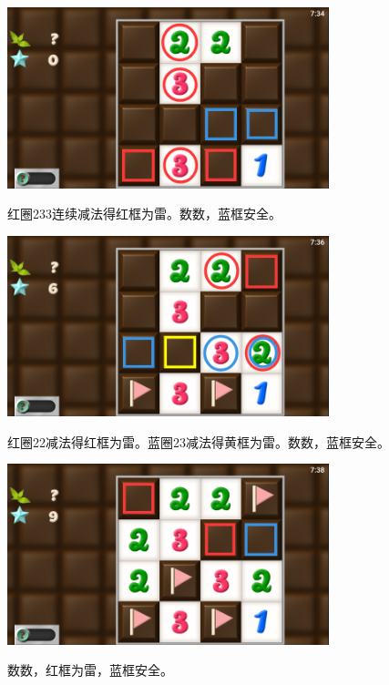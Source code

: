 \subsection{} %
\begin{center}
    \includegraphics[width=0.7\textwidth]{puzzle/44-1.png}
\end{center}
红圈233连续减法得红框为雷。数数，蓝框安全。
\begin{center}
    \includegraphics[width=0.7\textwidth]{puzzle/44-2.png}
\end{center}
红圈22减法得红框为雷。蓝圈23减法得黄框为雷。数数，蓝框安全。
\begin{center}
    \includegraphics[width=0.7\textwidth]{puzzle/44-3.png}
\end{center}
数数，红框为雷，蓝框安全。

